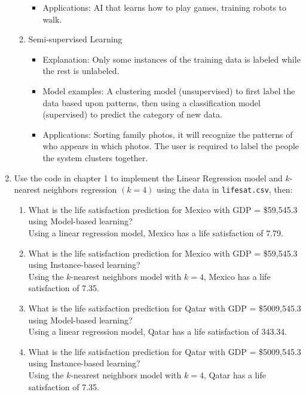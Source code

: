 \documentclass[a4paper,10pt]{article}
\begin{document}
\begin{enumerate}
\begin{enumerate}
\begin{itemize}
			\item Applications:
			AI that learns how to play games, training robots to walk.
		\end{itemize}
		\item Semi-supervised Learning
		\begin{itemize}
			\item Explanation:
			Only some instances of the training data is labeled while the rest is unlabeled.
			\item Model examples:
			A clustering model (unsupervised) to first label the data based upon patterns, then using a classification model (supervised) to predict the category of new data.
			\item Applications:
			Sorting family photos, it will recognize the patterns of who appears in which photos. The user is required to label the people the system clusters together.
		\end{itemize}
	\end{enumerate}
	
	\item Use the code in chapter 1 to implement the Linear Regression model and \( k \)-nearest neighbors regression \( (k=4) \) using the data in \texttt{lifesat.csv}, then:
	\begin{enumerate}
		\item What is the life satisfaction prediction for Mexico with GDP = \$59,545.3 using Model-based learning? \\
			Using a linear regression model, Mexico has a life satisfaction of 7.79.
			
		\item What is the life satisfaction prediction for Mexico with GDP = \$59,545.3 using Instance-based learning? \\
			Using the \( k \)-nearest neighbors model with \( k=4 \), Mexico has a life satisfaction of 7.35.
			
		\item What is the life satisfaction prediction for Qatar with GDP = \$5009,545.3 using Model-based learning? \\
			Using a linear regression model, Qatar has a life satisfaction of 343.34.
			
		\item What is the life satisfaction prediction for Qatar with GDP = \$5009,545.3
		using Instance-based learning? \\
			Using the \( k \)-nearest neighbors model with \( k=4 \), Qatar has a life satisfaction of 7.35.
			

\end{enumerate}
\end{enumerate}
\end{document}

